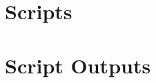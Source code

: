 \documentclass[12pt,a4paper]{article}
\begin{document}
    \newpage
    \section{Scripts}
    
    

    \newpage
    \section{Script Outputs}
    
    

    \newpage
    
    
\end{document}
